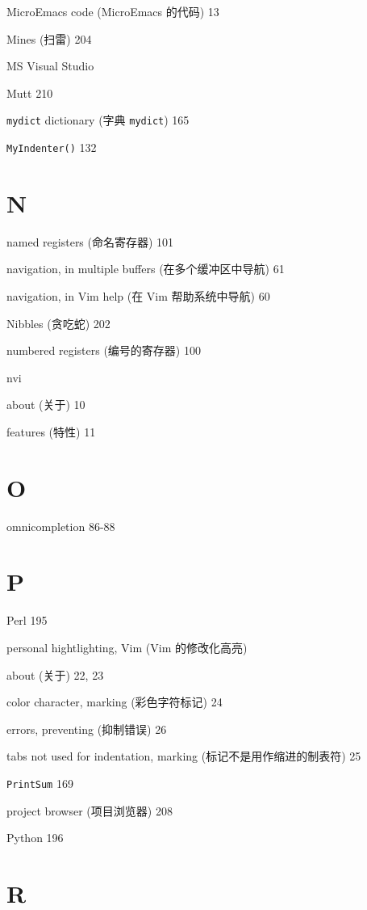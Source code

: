 \begin{multicols}{2}
MicroEmacs code (MicroEmacs 的代码) 13

Mines (扫雷) 204

MS Visual Studio

Mutt 210

\texttt{mydict} dictionary (字典 \texttt{mydict}) 165

\texttt{MyIndenter()} 132

\section*{N}

named registers (命名寄存器) 101

navigation, in multiple buffers (在多个缓冲区中导航) 61

navigation, in Vim help (在 Vim 帮助系统中导航) 60

Nibbles (贪吃蛇) 202

numbered registers (编号的寄存器) 100

nvi \par
  about (关于) 10 \par
  features (特性) 11 \par

\section*{O}

omnicompletion 86-88

\section*{P}

Perl 195

personal hightlighting, Vim (Vim 的修改化高亮) \par
  about (关于) 22, 23 \par
  color character, marking (彩色字符标记) 24 \par
  errors, preventing (抑制错误) 26 \par
  tabs not used for indentation, marking (标记不是用作缩进的制表符) 25 \par

\texttt{PrintSum} 169

project browser (项目浏览器) 208

Python 196

\section*{R}


\end{multicols}
